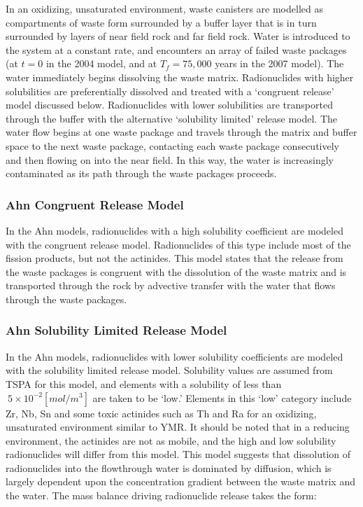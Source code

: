 In an oxidizing, unsaturated environment, waste canisters are modelled as 
compartments of waste form surrounded by a
buffer layer that is in turn surrounded by layers of near field rock and far
field rock. Water is introduced to the system at a constant rate, and
encounters an array of failed waste packages (at $t=0$ in the 2004 model, and
at $T_f=75,000$ years in the 2007 model). The water immediately begins
dissolving the waste matrix.  Radionuclides with higher solubilities are
preferentially dissolved and treated with a `congruent release' model discussed
below. Radionuclides with lower solubilities are transported through the buffer with
the alternative `solubility limited' release model. The water flow begins at
one waste package and travels through the matrix and buffer space to the next
waste package, contacting each waste package consecutively and then flowing on
into the near field. In this way, the water is increasingly contaminated as its
path through the waste packages proceeds.  

\subsubsection{Ahn Congruent Release Model} 

In the Ahn models, radionuclides with a high solubility coefficient are modeled with
the congruent release model.  Radionuclides of this type include most of the fission
products, but not the actinides. This model states that the release from the
waste packages is congruent with the dissolution of the waste matrix and is
transported through the rock by advective transfer with the water that flows
through the waste packages.  

\subsubsection{Ahn Solubility Limited Release Model}

In the Ahn models, radionuclides with lower solubility coefficients are modeled with
the solubility limited release model.  Solubility values are assumed from TSPA
for this model, and elements with a solubility of less than $~5\times 10^{-2}
[mol/m^3]$ are taken to be
`low.' Elements in this `low' category include Zr, Nb, Sn and some toxic actinides 
such as Th and Ra for an oxidizing, unsaturated environment similar to \gls{YMR}.
It should be noted that in a reducing environment, the actinides are not as mobile, 
and the high and low solubility radionuclides will differ from this model.
This model suggests that dissolution of radionuclides into the flowthrough water 
is dominated by diffusion, which is largely dependent upon the concentration 
gradient between the waste matrix and the water. The mass balance driving 
radionuclide release takes the form:

